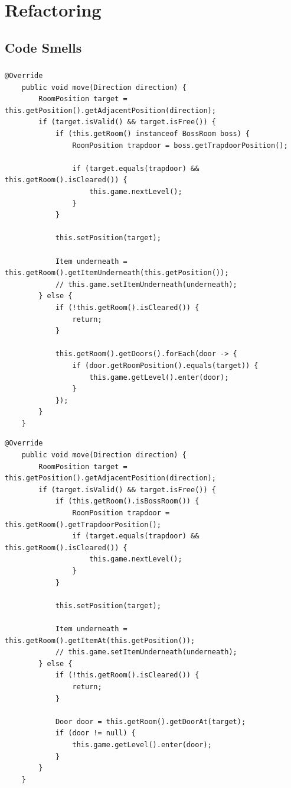 \chapter{Refactoring}

\section{Code Smells}

\subsection*{}
\vspace{0.5cm}
\begin{lstlisting}[caption={Code Smell I (Vorher)}]
    @Override
    public void move(Direction direction) {
        RoomPosition target = this.getPosition().getAdjacentPosition(direction);
        if (target.isValid() && target.isFree()) {
            if (this.getRoom() instanceof BossRoom boss) {
                RoomPosition trapdoor = boss.getTrapdoorPosition();
                
                if (target.equals(trapdoor) && this.getRoom().isCleared()) {
                    this.game.nextLevel();
                }
            }
            
            this.setPosition(target);
            
            Item underneath = this.getRoom().getItemUnderneath(this.getPosition());
            // this.game.setItemUnderneath(underneath);
        } else {
            if (!this.getRoom().isCleared()) {
                return;
            }
            
            this.getRoom().getDoors().forEach(door -> {
                if (door.getRoomPosition().equals(target)) {
                    this.game.getLevel().enter(door);
                }
            });
        }
    }
\end{lstlisting}

\vspace{0.5cm}
\begin{lstlisting}[caption={Code Smell I (Nachher)}]
    @Override
    public void move(Direction direction) {
        RoomPosition target = this.getPosition().getAdjacentPosition(direction);
        if (target.isValid() && target.isFree()) {
            if (this.getRoom().isBossRoom()) {
                RoomPosition trapdoor = this.getRoom().getTrapdoorPosition();
                if (target.equals(trapdoor) && this.getRoom().isCleared()) {
                    this.game.nextLevel();
                }
            }
            
            this.setPosition(target);
            
            Item underneath = this.getRoom().getItemAt(this.getPosition());
            // this.game.setItemUnderneath(underneath);
        } else {
            if (!this.getRoom().isCleared()) {
                return;
            }
            
            Door door = this.getRoom().getDoorAt(target);
            if (door != null) {
                this.game.getLevel().enter(door);
            }
        }
    }
\end{lstlisting}


